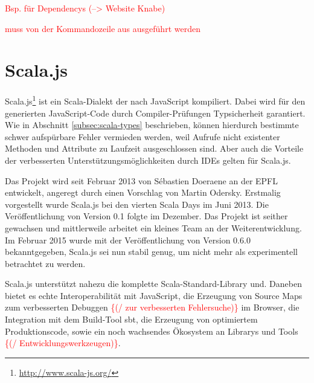 \documentclass[a4paper, 12pt, hidelinks, listof=totoc, listoftables=totoc, bibliography=totoc]{scrreprt}
\newcommand{\TODO}[1]{\textcolor{red}{#1}\newline}
\newcommand{\TODOi}[1]{\textcolor{red}{\{#1\}}}
\begin{document}
\TODO{Bsp. für Dependencys (-->  Website Knabe)}

\TODO{muss von der Kommandozeile aus ausgeführt werden}


\chapter{Scala.js}\label{chap:scala.js}

Scala.js\footnote{\url{http://www.scala-js.org/}} ist ein Scala-Dialekt der nach JavaScript kompiliert\cite[S. 1]{doeraene2013.TDI}. Dabei wird für den generierten JavaScript-Code durch Compiler-Prüfungen Typsicherheit garantiert. Wie in Abschnitt \ref{subsec:scala-types} beschrieben, können hierdurch bestimmte schwer aufspürbare Fehler vermieden werden, weil Aufrufe nicht existenter Methoden und Attribute zu Laufzeit ausgeschlossen sind. Aber auch die Vorteile der verbesserten Unterstützungsmöglichkeiten durch \ac{IDE}s gelten für Scala.js.

Das Projekt wird seit Februar 2013 von Sébastien Doeraene an der \ac{EPFL} entwickelt, angeregt durch einen Vorschlag von Martin Odersky.\cite{doeraene2013.CSJ} Erstmalig vorgestellt wurde Scala.js bei den vierten Scala Days im Juni 2013. Die Veröffentlichung von Version 0.1 folgte im Dezember. Das Projekt ist seither gewachsen und mittlerweile arbeitet ein kleines Team an der Weiterentwicklung. Im Februar 2015 wurde mit der Veröffentlichung von Version 0.6.0 bekanntgegeben, Scala.js sei nun stabil genug, um nicht mehr als experimentell betrachtet zu werden.\cite{doeraene2015.SNL}

Scala.js unterstützt nahezu die komplette Scala-Standard-Library und. Daneben bietet es echte Interoperabilität mit JavaScript, die Erzeugung von Source Maps zum verbesserten Debuggen \TODOi{(/ zur verbesserten Fehlersuche)} im Browser, die Integration mit dem Build-Tool sbt, die Erzeugung von optimiertem Produktionscode, sowie ein noch wachsendes Ökosystem an Librarys und Tools \TODOi{(/ Entwicklungswerkzeugen)}.
\end{document}

